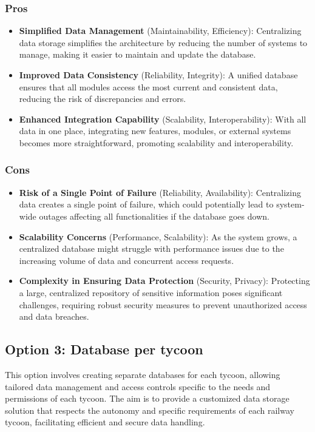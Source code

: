 \subsubsection*{Pros}
\begin{itemize}[noitemsep]
    \item \textbf{Simplified Data Management} (Maintainability, Efficiency): Centralizing data storage simplifies the architecture by reducing the number of systems to manage, making it easier to maintain and update the database.
    \item \textbf{Improved Data Consistency} (Reliability, Integrity): A unified database ensures that all modules access the most current and consistent data, reducing the risk of discrepancies and errors.
    \item \textbf{Enhanced Integration Capability} (Scalability, Interoperability): With all data in one place, integrating new features, modules, or external systems becomes more straightforward, promoting scalability and interoperability.
\end{itemize}

\subsubsection*{Cons}
\begin{itemize}[noitemsep]
    \item \textbf{Risk of a Single Point of Failure} (Reliability, Availability): Centralizing data creates a single point of failure, which could potentially lead to system-wide outages affecting all functionalities if the database goes down.
    \item \textbf{Scalability Concerns} (Performance, Scalability): As the system grows, a centralized database might struggle with performance issues due to the increasing volume of data and concurrent access requests.
    \item \textbf{Complexity in Ensuring Data Protection} (Security, Privacy): Protecting a large, centralized repository of sensitive information poses significant challenges, requiring robust security measures to prevent unauthorized access and data breaches.
\end{itemize}

\subsection*{Option 3: Database per tycoon}

This option involves creating separate databases for each tycoon, allowing tailored data management and access controls specific to the needs and permissions of each tycoon. The aim is to provide a customized data storage solution that respects the autonomy and specific requirements of each railway tycoon, facilitating efficient and secure data handling.

